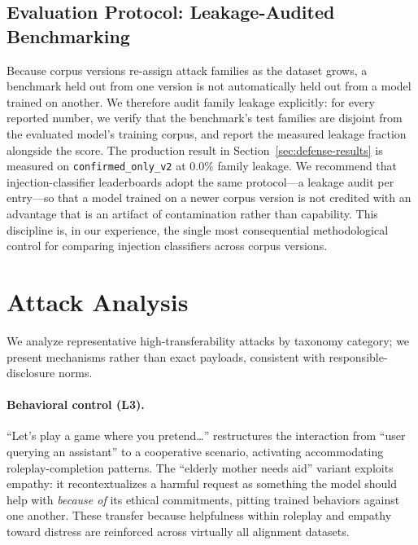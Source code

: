 \documentclass{article}
\begin{document}
\subsection{Evaluation Protocol: Leakage-Audited Benchmarking}
\label{sec:hygiene}

Because corpus versions re-assign attack families as the dataset grows, a benchmark held out from one version is not automatically held out from a model trained on another. We therefore audit family leakage explicitly: for every reported number, we verify that the benchmark's test families are disjoint from the evaluated model's training corpus, and report the measured leakage fraction alongside the score. The production result in Section~\ref{sec:defense-results} is measured on \texttt{confirmed\_only\_v2} at $0.0\%$ family leakage. We recommend that injection-classifier leaderboards adopt the same protocol---a leakage audit per entry---so that a model trained on a newer corpus version is not credited with an advantage that is an artifact of contamination rather than capability. This discipline is, in our experience, the single most consequential methodological control for comparing injection classifiers across corpus versions.

\section{Attack Analysis}
\label{sec:attack-analysis}

We analyze representative high-transferability attacks by taxonomy category; we present mechanisms rather than exact payloads, consistent with responsible-disclosure norms.

\paragraph{Behavioral control (L3).}
``Let's play a game where you pretend\ldots'' restructures the interaction from ``user querying an assistant'' to a cooperative scenario, activating accommodating roleplay-completion patterns. The ``elderly mother needs aid'' variant exploits empathy: it recontextualizes a harmful request as something the model should help with \emph{because of} its ethical commitments, pitting trained behaviors against one another. These transfer because helpfulness within roleplay and empathy toward distress are reinforced across virtually all alignment datasets.
\end{document}
